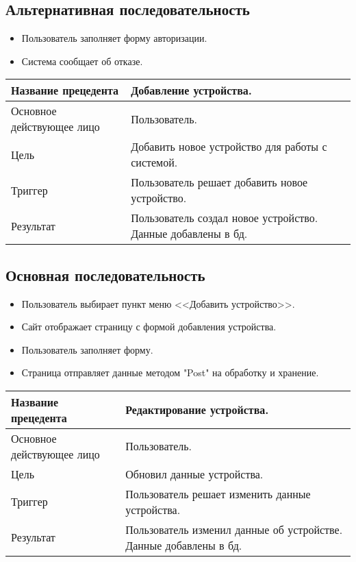 \subsection{Альтернативная последовательность}
\begin{itemize}
    \item Пользователь заполняет форму авторизации.
    \item Система сообщает об отказе.
\end{itemize}

\begin{center}
    \begin{tabularx}{\textwidth}{|X|X|} \hline
    Название прецедента       & Добавление устройства.\\ \hline
    Основное действующее лицо & Пользователь.\\ \hline
    Цель                      & Добавить новое устройство для работы с системой.\\ \hline
    Триггер                   & Пользователь решает добавить новое устройство.\\ \hline
    Результат                 & Пользователь создал новое устройство. Данные добавлены в бд.\\ \hline
    \end{tabularx}
\end{center}

\subsection{Основная последовательность}
\begin{itemize}
    \item Пользователь выбирает пункт меню <<Добавить устройство>>.
    \item Сайт отображает страницу с формой добавления устройства.
    \item Пользователь заполняет форму.
    \item Страница отправляет данные методом "Post" на обработку и хранение. 
\end{itemize}

\begin{center}
    \begin{tabularx}{\textwidth}{|X|X|} \hline
    Название прецедента       & Редактирование устройства.\\ \hline
    Основное действующее лицо & Пользователь.\\ \hline
    Цель                      & Обновил данные устройства.\\ \hline
    Триггер                   & Пользователь решает изменить данные устройства.\\ \hline
    Результат                 & Пользователь изменил данные об устройстве. Данные добавлены в бд.\\ \hline
    \end{tabularx}
\end{center}

